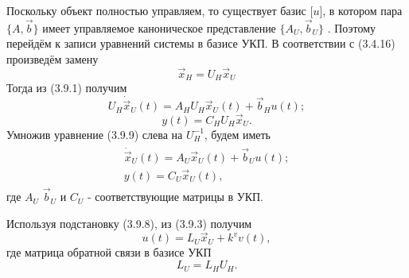 Поскольку объект полностью управляем, то существует базис [$u$], в котором пара $\{A,\vec{b}\}$ имеет управляемое каноническое представление $\{A_U,\vec{b}_U\}$ . Поэтому перейдём к записи уравнений системы в базисе УКП. В соответствии с (3.4.16) произведём замену 
\begin{equation}
	\vec{x}_H=U_H\vec{x}_U
\end{equation}
Тогда из (3.9.1) получим
\begin{equation}
	U_H\dot{\vec{x}}_U(t)=A_HU_H\vec{x}_U(t)+\vec{b}_Hu(t);
\end{equation}
\begin{equation}
	y(t)=C_HU_H\vec{x}_U.
\end{equation}
Умножив уравнение (3.9.9) слева на $U_H^{-1}$, будем иметь
\begin{gather}
\begin{split}
	\dot{\vec{x}}_U(t)=A_U\vec{x}_U(t)+\vec{b}_Uu(t);\\
	y(t) = C_U\vec{x}_U(t),
\end{split}
\end{gather}
где $A_U$ $\vec{b}_U$ и $C_U$ - соответствующие матрицы в УКП.

Используя подстановку (3.9.8), из (3.9.3) получим
\begin{equation}
	u(t)=L_U\vec{x}_U+k^vv(t),
\end{equation}
где матрица обратной связи в базисе УКП
\begin{equation}
	L_U=L_HU_H.
\end{equation}

